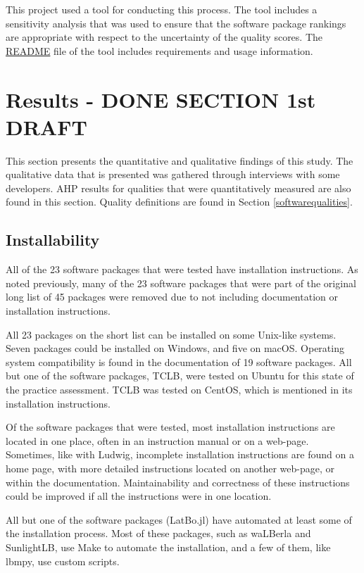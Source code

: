 \documentclass[12pt, notitlepage]{article}
\begin{document}
This project used a tool for conducting this process. The tool includes a sensitivity analysis that was used to ensure that the software package rankings are appropriate with respect to the uncertainty of the quality scores. The \href{https://github.com/smiths/AIMSS/blob/master/StateOfPractice/AHP2020/LBM/README.txt}{README} file of the tool includes requirements and usage information.

\newpage
\section{Results - DONE SECTION 1st DRAFT}\label{qualityresults}

This section presents the quantitative and qualitative findings of this study.  The qualitative data that is presented was gathered through interviews with some developers. AHP results for qualities that were quantitatively measured are also found in this section. Quality definitions are found in Section \ref{softwarequalities}.

\subsection{Installability}

All of the 23 software packages that were tested have installation instructions. As noted previously, many of the 23 software packages that were part of the original long list of 45 packages were removed due to not including documentation or installation instructions. 

All 23 packages on the short list can be installed on some Unix-like systems. Seven packages could be installed on Windows, and five on macOS. Operating system compatibility is found in the documentation of 19 software packages. All but one of the software packages, TCLB, were tested on Ubuntu for this state of the practice assessment. TCLB was tested on CentOS, which is mentioned in its installation instructions.

Of the software packages that were tested, most installation instructions are located in one place, often in an instruction manual or on a web-page. Sometimes, like with Ludwig, incomplete installation instructions are found on a home page, with more detailed instructions located on another web-page, or within the documentation. Maintainability and correctness of these instructions could be improved if all the instructions were in one location. 

All but one of the software packages (LatBo.jl) have automated at least some of the installation process. Most of these packages, such as waLBerla and SunlightLB, use Make to automate the installation, and a few of them, like lbmpy, use custom scripts.
\end{document}
